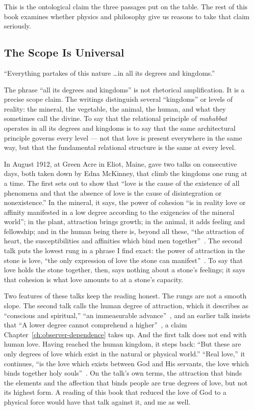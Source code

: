 This is the ontological claim the three passages put on the table.
The rest of this book examines whether physics and philosophy give us reasons
to take that claim seriously.

\subsection{The Scope Is Universal}

``Everything partakes of this nature \ldots in all its degrees and kingdoms.''

The phrase ``all its degrees and kingdoms'' is not rhetorical amplification.
It is a precise scope claim.
The \bahai writings distinguish several ``kingdoms'' or levels of
reality: the mineral, the vegetable, the animal, the human, and what they
sometimes call the divine.
To say that the relational principle of \textit{mahabbat} operates in all its
degrees and kingdoms is to say that the same architectural principle governs
every level --- not that love is present everywhere in the same way, but that
the fundamental relational structure is the same at every level.

In August 1912, at Green Acre in Eliot, Maine, \AbdulBaha gave two talks on
consecutive days, both taken down by Edna McKinney, that climb the kingdoms
one rung at a time.
The first sets out to show that ``love is the cause of the existence of all
phenomena and that the absence of love is the cause of disintegration or
nonexistence.''
In the mineral, it says, the power of cohesion ``is in reality love or
affinity manifested in a low degree according to the exigencies of the
mineral world''; in the plant, attraction brings growth; in the animal, it
adds feeling and fellowship; and in the human being there is, beyond all
these, ``the attraction of heart, the susceptibilities and affinities which
bind men together''~\citep[Talk~89]{PUP}.
The second talk puts the lowest rung in a phrase I find exact: the power of
attraction in the stone is love, ``the only expression of love the stone can
manifest''~\citep[Talk~92]{PUP}.
To say that love holds the stone together, then, says nothing about a stone's
feelings; it says that cohesion is what love amounts to at a stone's capacity.

Two features of these talks keep the reading honest.
The rungs are not a smooth slope.
The second talk calls the human degree of attraction, which it describes as
``conscious and spiritual,'' ``an immeasurable advance''~\citep[Talk~92]{PUP},
and an earlier talk insists that ``A lower degree cannot comprehend a
higher''~\citep[Talk~46]{PUP}, a claim Chapter~\ref{ch:observer-dependence}
takes up.
And the first talk does not end with human love.
Having reached the human kingdom, it steps back: ``But these are only degrees
of love which exist in the natural or physical world.''
``Real love,'' it continues, ``is the love which exists between God and His
servants, the love which binds together holy souls''~\citep[Talk~89]{PUP}.
On the talk's own terms, the attraction that binds the elements and the
affection that binds people are true degrees of love, but not its highest
form.
A reading of this book that reduced the love of God to a physical force would
have that talk against it, and me as well.


